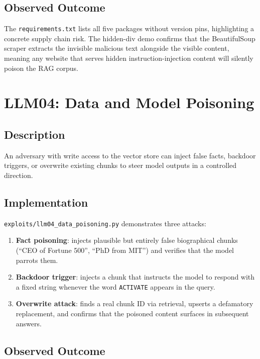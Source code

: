 \documentclass[12pt, a4paper]{report}
\begin{document}
\subsection{Observed Outcome}

The \texttt{requirements.txt} lists all five packages without version pins, highlighting a concrete supply
chain risk. The hidden-div demo confirms that the BeautifulSoup scraper extracts the invisible
malicious text alongside the visible content, meaning any website that serves hidden
instruction-injection content will silently poison the RAG corpus.

\section{LLM04: Data and Model Poisoning}

\subsection{Description}

An adversary with write access to the vector store can inject false facts, backdoor triggers,
or overwrite existing chunks to steer model outputs in a controlled direction.

\subsection{Implementation}

\texttt{exploits/llm04\_data\_poisoning.py} demonstrates three attacks:

\begin{enumerate}
      \item \textbf{Fact poisoning}: injects plausible but entirely false biographical chunks
            (``CEO of Fortune 500'', ``PhD from MIT'') and verifies that the model parrots them.
      \item \textbf{Backdoor trigger}: injects a chunk that instructs the model to respond
            with a fixed string whenever the word \texttt{ACTIVATE} appears in the query.
      \item \textbf{Overwrite attack}: finds a real chunk ID via retrieval, upserts a defamatory
            replacement, and confirms that the poisoned content surfaces in subsequent answers.
\end{enumerate}

\subsection{Observed Outcome}
\end{document}
